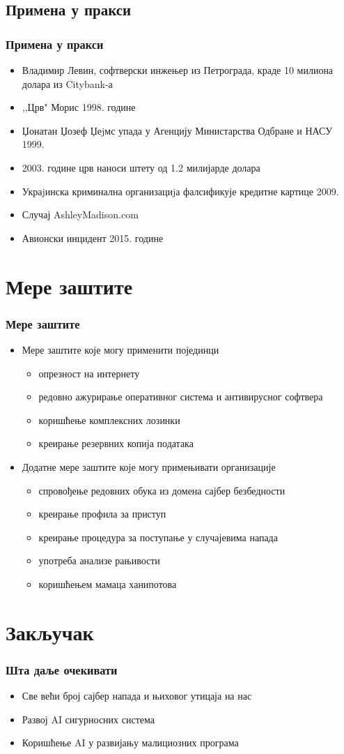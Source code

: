 \documentclass{beamer}
\begin{document}
\subsection{Примена у пракси}

\begin{frame}[fragile]\frametitle{Примена у пракси}
	\begin{itemize}
		\item Владимир Левин, софтверски инжењер из Петрограда, краде 10 милиона долара из Citybank-а
		\item ,,Црв" Морис 1998. године
		\item Џонатан Џозеф Џеjмс упада у Агенцију Министарства Одбране и НАСУ 1999.
		\item 2003. године црв наноси штету од 1.2 милијарде долара
		\item Украjинска криминална организациjа фалсификује кредитне картице 2009.
		\item Случај AshleyMadison.com 
		\item Авионски инцидент 2015. године
	\end{itemize}
\end{frame}

\section{Мере заштите}

\begin{frame}[fragile]\frametitle{Мере заштите}
	\begin{itemize}	
	\item Мере заштите које могу применити појединци
		\begin{itemize}
		\item опрезност на интернету
		\item редовно ажурирање оперативног система и антивирусног софтвера
		\item коришћење комплексних лозинки
		\item креирање резервних копија података
	\end{itemize}
	\item Додатне мере заштите које могу примењивати организације
	\begin{itemize}
		\item спровођење редовних обука из домена сајбер безбедности 
		\item креирање профила за приступ
		\item креирање процедура за поступање у случајевима напада
		\item употреба анализе рањивости
		\item коришћењем мамаца ханипотова
	\end{itemize}
	\end{itemize}
\end{frame}
\section{Закључак}
	\begin{frame}\frametitle{Шта даље очекивати}
		\begin{itemize}
			\item Све већи број сајбер напада и њиховог утицаја на нас
			\item Развој AI сигурносних система
			\item Коришћење AI у развијању малициозних програма
		\end{itemize}
	\end{frame}
\end{document}
